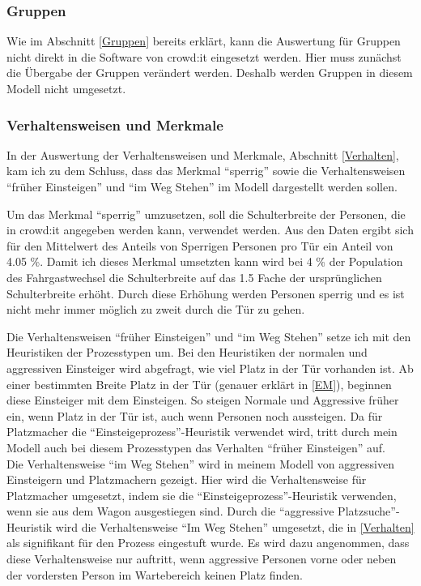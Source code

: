 \subsubsection{Gruppen}
Wie im Abschnitt \ref{Gruppen} bereits erklärt, kann die Auswertung für Gruppen nicht direkt in die Software von crowd:it eingesetzt werden. Hier muss zunächst die Übergabe der Gruppen verändert werden. Deshalb werden Gruppen in diesem Modell nicht umgesetzt.
\subsubsection{Verhaltensweisen und Merkmale}
In der Auswertung der Verhaltensweisen und Merkmale, Abschnitt \ref{Verhalten}, kam ich zu dem Schluss, dass das Merkmal "`sperrig"' sowie die Verhaltensweisen "`früher Einsteigen"' und "`im Weg Stehen"' im Modell dargestellt werden sollen. 

Um das Merkmal "`sperrig"' umzusetzen, soll die Schulterbreite der Personen, die in crowd:it angegeben werden kann, verwendet werden. Aus den Daten ergibt sich für den Mittelwert des Anteils von Sperrigen Personen pro Tür ein Anteil von 4.05 \%. Damit ich dieses Merkmal umsetzten kann wird bei 4 \% der Population des Fahrgastwechsel die Schulterbreite auf das 1.5 Fache der ursprünglichen Schulterbreite erhöht. Durch diese Erhöhung werden Personen sperrig und es ist nicht mehr immer möglich zu zweit durch die Tür zu gehen.

Die Verhaltensweisen "`früher Einsteigen"' und "`im Weg Stehen"' setze ich mit den Heuristiken der Prozesstypen um. Bei den Heuristiken der normalen und aggressiven Einsteiger wird abgefragt, wie viel Platz in der Tür vorhanden ist. Ab einer bestimmten Breite Platz in der Tür (genauer erklärt in \ref{EM}), beginnen diese Einsteiger mit dem Einsteigen. So steigen Normale und Aggressive früher ein, wenn Platz in der Tür ist, auch wenn Personen noch aussteigen. Da für Platzmacher die "`Einsteigeprozess"'-Heuristik verwendet wird, tritt durch mein Modell auch bei diesem Prozesstypen das Verhalten "`früher Einsteigen"' auf.\\
Die Verhaltensweise "`im Weg Stehen"' wird in meinem Modell von aggressiven Einsteigern und Platzmachern gezeigt. Hier wird die Verhaltensweise für Platzmacher umgesetzt, indem sie die "`Einsteigeprozess"'-Heuristik verwenden, wenn sie aus dem Wagon ausgestiegen sind. Durch die "`aggressive Platzsuche"'-Heuristik wird die Verhaltensweise "`Im Weg Stehen"' umgesetzt, die in \ref{Verhalten} als signifikant für den Prozess eingestuft wurde. Es wird dazu angenommen, dass diese Verhaltensweise nur auftritt, wenn aggressive Personen vorne oder neben der vordersten Person im Wartebereich keinen Platz finden.

